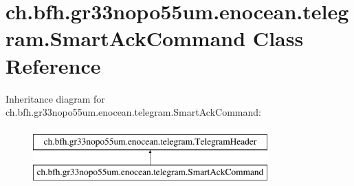 \hypertarget{classch_1_1bfh_1_1gr33nopo55um_1_1enocean_1_1telegram_1_1_smart_ack_command}{}\section{ch.\+bfh.\+gr33nopo55um.\+enocean.\+telegram.\+Smart\+Ack\+Command Class Reference}
\label{classch_1_1bfh_1_1gr33nopo55um_1_1enocean_1_1telegram_1_1_smart_ack_command}
Inheritance diagram for ch.\+bfh.\+gr33nopo55um.\+enocean.\+telegram.\+Smart\+Ack\+Command\+:\begin{figure}[H]
\begin{center}
\leavevmode
\includegraphics[height=2.000000cm]{classch_1_1bfh_1_1gr33nopo55um_1_1enocean_1_1telegram_1_1_smart_ack_command}
\end{center}
\end{figure}
